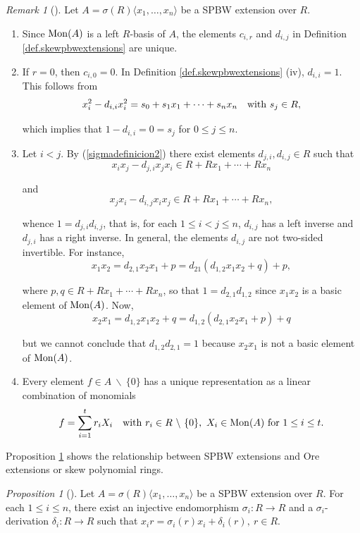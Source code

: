 \documentclass{amsart}
\theoremstyle{definition}
\theoremstyle{remark}
\newtheorem{remark}[theorem]{Remark}
\newtheorem{proposition}[theorem]{Proposition}
\numberwithin{equation}{section}
\begin{document}
\begin{remark}[{\cite[Remark 2]{GallegoLezama2010}}]\label{notesondefsigampbw} 
Let $A=\sigma(R)\langle x_1, \dots, x_n\rangle$ be a SPBW extension over $R$.
\begin{enumerate}
\item [\rm (i)] Since ${\rm Mon}(A)$ is a left $R$-basis of $A$, the elements $c_{i,r}$ and $d_{i,j}$ in Definition \ref{def.skewpbwextensions} are unique.

\item [\rm (ii)] If $r = 0$, then $c_{i,0}= 0$. In Definition \ref{def.skewpbwextensions} (iv), $d_{i,i}=1$. This follows from 
$$
x_i^2-d_{i,i}x_i^2=s_0+s_1x_1+\cdots + s_nx_n \quad {\rm with} \ s_j\in R,
$$

which implies that $1-d_{i,i}=0=s_j$ for $0\leq j\leq n$.

\item [\rm (iii)] Let $i<j$. By (\ref{sigmadefinicion2}) there exist elements
$d_{j,i}, d_{i,j}\in R$ such that 
$$
x_ix_j - d_{j,i}x_jx_i\in R+Rx_1+\cdots +Rx_n
$$ 

and
$$
x_jx_i-d_{i,j}x_ix_j\in R+Rx_1+\cdots+Rx_n,
$$

whence $1 = d_{j,i}d_{i,j}$, that is, for each
$1\leq i<j\leq n$, $d_{i,j}$ has a left inverse and $d_{j,i}$ has a right inverse. In general, the elements $d_{i,j}$ are not two-sided invertible. For instance, 
$$
x_1x_2 = d_{2,1}x_2x_1+p = d_{21}(d_{1,2}x_1x_2+q) + p,
$$

where $p,q\in R+Rx_1+\dotsb + Rx_n$, so that $1 = d_{2,1}d_{1,2}$ since $x_1x_2$ is a basic element of ${\rm Mon}(A)$. Now, 
$$
x_2x_1 = d_{1,2}x_1x_2+q = d_{1,2}(d_{2,1}x_2x_1+p) + q
$$

but we cannot conclude that $d_{1,2}d_{2,1}=1$
because $x_2x_1$ is not a basic element of ${\rm Mon}(A)$.

\item[\rm (iv)] Every element $f\in A\ \backslash\ \{0\}$ has a unique representation as a linear combination of monomials $$
f = \sum\limits_{i=1}^{t} r_iX_i \quad {\rm with} \ r_i\in R\ \backslash\ \{0\}, \ X_i\in {\rm Mon}(A) \ {\rm for} \ 1\leq i\leq t.
$$
\end{enumerate}
\end{remark}

Proposition \ref{sigmadefinition} shows the relationship between SPBW extensions and Ore extensions or skew polynomial rings.
\begin{proposition}[{\cite[Proposition 3]{GallegoLezama2010}}]\label{sigmadefinition}
Let $A=\sigma(R)\langle x_1, \dots, x_n\rangle$ be a SPBW extension over $R$. For each $1\leq i\leq n$, there exist an injective endomorphism $\sigma_i:R\rightarrow
R$ and a $\sigma_i$-derivation $\delta_i:R\rightarrow R$ such that $x_ir=\sigma_i(r)x_i+\delta_i(r), \ r \in R.$
\end{proposition}
\end{document}
